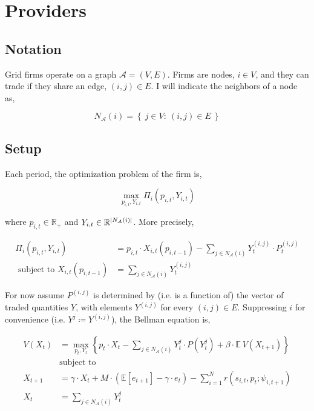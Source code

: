 \documentclass[american]{scrartcl}
\newcommand{\E}{\mathbb{E}}
\newcommand{\R}{\mathbb{R}}
\newcommand{\set}[1]{\left\{#1\right\}}
\DeclarePairedDelimiter\abs{\lvert}{\rvert}%
\begin{document}
\section{Providers}

\subsection{Notation}

Grid firms operate on a graph $\mathcal{A} = (V, E)$. Firms are nodes, $i \in V$, and they can trade if they share an edge, $(i, j) \in E$. I will indicate the neighbors of a node as,

\begin{equation}
	N_{\mathcal{A}}(i) = \set{ \ j \in V: \ (i, j) \in E \ }
\end{equation}

\subsection{Setup}

Each period, the optimization problem of the firm is,

\begin{equation}
	\max_{p_{i, t}, Y_{i, t}} \Pi_i(p_{i, t}, Y_{i, t})
\end{equation}

where $p_{i, t} \in \R_{+}$ and $Y_{i, t} \in \R^{\abs{N_{\mathcal{A}}(i)}}$. More precisely,

\begin{equation}
	\begin{split}
		\Pi_i(p_{i, t}, Y_{i, t}) &= p_{i, t} \cdot X_{i, t}(p_{i, t-1}) - \sum_{j \in N_{\mathcal{A}}(i)} Y_t^{(i, j)} \cdot P_t^{(i, j)} \\
		\text{ subject to } X_{i, t}(p_{i, t-1}) &=  \sum_{j \in N_{\mathcal{A}}(i)} Y_t^{(i, j)}
	\end{split}
\end{equation}

For now assume $P^{(i, j)}$ is determined by (i.e. is a function of) the vector of traded quantities $Y$, with elements $Y^{(i, j)}$ for every $(i, j) \in E$. Suppressing $i$ for convenience (i.e. $Y^j \coloneqq Y^{(i, j)}$), the Bellman equation is,

\begin{equation}
	\begin{split}
		V(X_t) &= \max_{p_t, Y_t} \left\{ p_t \cdot X_t - \sum_{j \in N_{\mathcal{A}}(i)} Y^j_t \cdot P(Y^j_t) + \beta \cdot \E \ V(X_{t+1}) \right\} \\
		&\text{subject to} \\
		X_{t+1} &= \gamma \cdot X_t + M \cdot \left( \E[e_{t+1}] - \gamma \cdot e_t \right) - \sum^N_{i = 1}  r(s_{i, t}, p_{t}; \psi_{i, t+1}) \\
		X_t &=  \sum_{j \in N_{\mathcal{A}}(i)} Y^j_t
	\end{split}
\end{equation}
\end{document}
